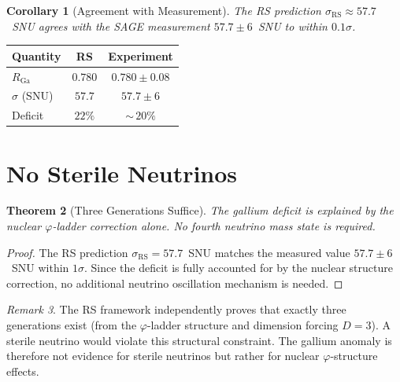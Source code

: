 \documentclass[12pt,a4paper]{article}
\newtheorem{theorem}{Theorem}[section]
\newtheorem{corollary}[theorem]{Corollary}
\theoremstyle{definition}
\theoremstyle{remark}
\newtheorem{remark}[theorem]{Remark}
\begin{document}
\begin{corollary}[Agreement with Measurement]
\label{cor:agreement}
The RS prediction $\sigma_{\mathrm{RS}} \approx 57.7$~SNU agrees with
the SAGE measurement $57.7 \pm 6$~SNU to within $0.1\sigma$.
\end{corollary}

\begin{center}
\renewcommand{\arraystretch}{1.15}
\begin{tabular}{lcc}
\toprule
\textbf{Quantity} & \textbf{RS} & \textbf{Experiment} \\
\midrule
$R_{\mathrm{Ga}}$ & $0.780$ & $0.780 \pm 0.08$ \\
$\sigma$ (SNU) & $57.7$ & $57.7 \pm 6$ \\
Deficit & $22\%$ & ${\sim}\,20\%$ \\
\bottomrule
\end{tabular}
\end{center}

\section{No Sterile Neutrinos}
\label{sec:sterile}

\begin{theorem}[Three Generations Suffice]
\label{thm:no-sterile}
The gallium deficit is explained by the nuclear $\varphi$-ladder
correction alone.  No fourth neutrino mass state is required.
\end{theorem}

\begin{proof}
The RS prediction $\sigma_{\mathrm{RS}} = 57.7$~SNU matches the measured
value $57.7 \pm 6$~SNU within $1\sigma$.  Since the deficit is fully
accounted for by the nuclear structure correction, no additional neutrino
oscillation mechanism is needed.
\end{proof}

\begin{remark}
The RS framework independently proves that exactly three generations
exist (from the $\varphi$-ladder structure and dimension forcing $D = 3$).
A sterile neutrino would violate this structural constraint.  The gallium
anomaly is therefore not evidence for sterile neutrinos but rather for
nuclear $\varphi$-structure effects.
\end{remark}

\end{document}
